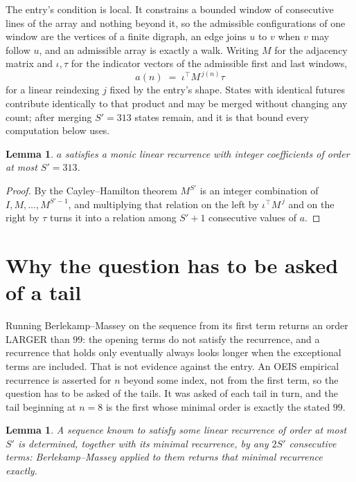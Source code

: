 \documentclass[11pt,a4paper]{article}
\theoremstyle{plain}
\newtheorem{lemma}[theorem]{Lemma}
\theoremstyle{definition}
\begin{document}
The entry's condition is local. It constrains a bounded window of consecutive lines of the
array and nothing beyond it, so the admissible configurations of one window are the vertices of
a finite digraph, an edge joins $u$ to $v$ when $v$ may follow $u$, and an admissible array is
exactly a walk. Writing $M$ for the adjacency matrix and $\iota,\tau$ for the indicator vectors
of the admissible first and last windows,
\[
a(n)\;=\;\iota^{\!\top}M^{\,j(n)}\tau
\]
for a linear reindexing $j$ fixed by the entry's shape. States with identical futures
contribute identically to that product and may be merged without changing any count; after
merging $S'=313$ states remain, and it is that bound every computation below uses.

\begin{lemma}\label{lem:cf}
$a$ satisfies a monic linear recurrence with integer coefficients of order at most $S'=313$.
\end{lemma}

\begin{proof}
By the Cayley--Hamilton theorem $M^{S'}$ is an integer combination of $I,M,\dots,M^{S'-1}$,
and multiplying that relation on the left by $\iota^{\!\top}M^{\,j}$ and on the right by
$\tau$ turns it into a relation among $S'+1$ consecutive values of $a$.
\end{proof}

\section{Why the question has to be asked of a tail}

Running Berlekamp--Massey on the sequence from its first term returns an order LARGER than $99$: the opening terms do not satisfy the recurrence, and a recurrence that holds only eventually always looks longer when the exceptional terms are included. That is not evidence against the entry. An OEIS empirical recurrence is asserted for $n$ beyond some index, not from the first term, so the question has to be asked of the tails. It was asked of each tail in turn, and the tail beginning at $n=8$ is the first whose minimal order is exactly the stated $99$.

\begin{lemma}\label{lem:bm}
A sequence known to satisfy some linear recurrence of order at most $S'$ is determined,
together with its minimal recurrence, by any $2S'$ consecutive terms: Berlekamp--Massey applied
to them returns that minimal recurrence exactly.
\end{lemma}
\end{document}
